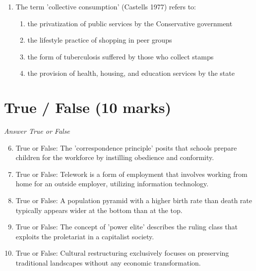 \documentclass[12pt]{article}
\begin{document}
\begin{enumerate}[label=\arabic*.]
\begin{enumerate}[label=(\alph*)]
    \item race is an objective way of categorizing people on biological grounds
    \item the idea of race is socially constructed through powerful ideologies
    \item race relations in Britain and America can be traced back to colonial times
    \item people choose their racial identity and this becomes fixed
\end{enumerate}
\item The term 'collective consumption' (Castells 1977) refers to:
\begin{enumerate}[label=(\alph*)]
    \item the privatization of public services by the Conservative government
    \item the lifestyle practice of shopping in peer groups
    \item the form of tuberculosis suffered by those who collect stamps
    \item the provision of health, housing, and education services by the state
\end{enumerate}
\end{enumerate}

\section*{True / False (10 marks)}
\textit{Answer True or False}
\begin{enumerate}[label=\arabic*.]
\setcounter{enumi}{5}
\item True or False: The 'correspondence principle' posits that schools prepare children for the workforce by instilling obedience and conformity.
\item True or False: Telework is a form of employment that involves working from home for an outside employer, utilizing information technology.
\item True or False: A population pyramid with a higher birth rate than death rate typically appears wider at the bottom than at the top.
\item True or False: The concept of 'power elite' describes the ruling class that exploits the proletariat in a capitalist society.
\item True or False: Cultural restructuring exclusively focuses on preserving traditional landscapes without any economic transformation.
\end{enumerate}
\end{document}

